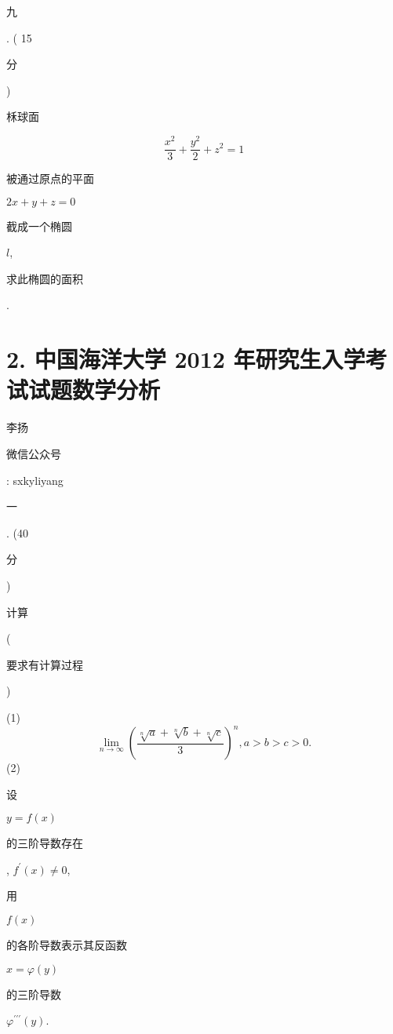 \documentclass[10pt]{article}
\begin{document}
\begin{CJK}{UTF8}{mj}九\end{CJK}. ( 15 \begin{CJK}{UTF8}{mj}分\end{CJK}) \begin{CJK}{UTF8}{mj}柇球面\end{CJK}
$$
\frac{x^{2}}{3}+\frac{y^{2}}{2}+z^{2}=1
$$
\begin{CJK}{UTF8}{mj}被通过原点的平面\end{CJK} $2 x+y+z=0$ \begin{CJK}{UTF8}{mj}截成一个椭圆\end{CJK} $l$, \begin{CJK}{UTF8}{mj}求此椭圆的面积\end{CJK}.

\section{2. 中国海洋大学 2012 年研究生入学考试试题数学分析}
\begin{CJK}{UTF8}{mj}李扬\end{CJK}

\begin{CJK}{UTF8}{mj}微信公众号\end{CJK}: sxkyliyang

\begin{CJK}{UTF8}{mj}一\end{CJK}. (40 \begin{CJK}{UTF8}{mj}分\end{CJK}) \begin{CJK}{UTF8}{mj}计算\end{CJK} (\begin{CJK}{UTF8}{mj}要求有计算过程\end{CJK})

(1)
$$
\lim _{n \rightarrow \infty}\left(\frac{\sqrt[n]{a}+\sqrt[n]{b}+\sqrt[n]{c}}{3}\right)^{n}, a>b>c>0 .
$$
(2) \begin{CJK}{UTF8}{mj}设\end{CJK} $y=f(x)$ \begin{CJK}{UTF8}{mj}的三阶导数存在\end{CJK}, $f^{\prime}(x) \neq 0$, \begin{CJK}{UTF8}{mj}用\end{CJK} $f(x)$ \begin{CJK}{UTF8}{mj}的各阶导数表示其反函数\end{CJK} $x=\varphi(y)$ \begin{CJK}{UTF8}{mj}的三阶导数\end{CJK} $\varphi^{\prime \prime \prime}(y)$.
\end{document}
